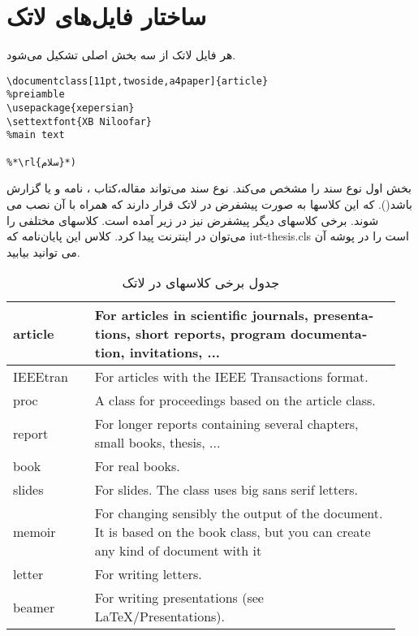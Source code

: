 \section{ساختار فایل‌های لاتک}
هر فایل لاتک از سه بخش اصلی تشکیل می‌شود. 
\begin{latin}
\begin{lstlisting}[style=Tex]
%document type
\documentclass[11pt,twoside,a4paper]{article}
%preiamble
\usepackage{xepersian}
\settextfont{XB Niloofar}
%main text
 
%*\rl{سلام}*)

\end{lstlisting}
\end{latin}
 بخش اول نوع سند را مشخص می‌کند. نوع سند می‌تواند مقاله،کتاب ، نامه و یا گزارش باشد(). که این کلاسها به صورت پیشفرض در لاتک قرار دارند که همراه با آن نصب می شوند. برخی کلاسهای دیگر پیشفرض نیز در زیر آمده است. کلاسهای مختلفی را می‌توان در اینترنت پیدا کرد. کلاس این پایان‌نامه که iut-thesis.cls است را در پوشه آن می توانید بیابید.
   \begin{table}[h]
    \begin{latin}
  \begin{center}
 \begin{tabular}{|m{0.2\linewidth}|m{0.75\linewidth}|}
 \hline
article & For articles in scientific journals, presentations, short reports, program documentation, invitations, ...\\\hline
IEEEtran & For articles with the IEEE Transactions format.\\\hline
proc & A class for proceedings based on the article class.\\\hline
report & For longer reports containing several chapters, small books, thesis, ...\\\hline
book & For real books.\\\hline
slides & For slides. The class uses big sans serif letters.\\\hline
memoir & For changing sensibly the output of the document. It is based on the book class, but you can create any kind of document with it \\\hline
letter & For writing letters.\\\hline
beamer & For writing presentations (see LaTeX/Presentations).\\\hline
  \end{tabular}
    \end{center}
 \end{latin}
  \caption{جدول برخی کلاسهای در لاتک}
 \end{table}
 
